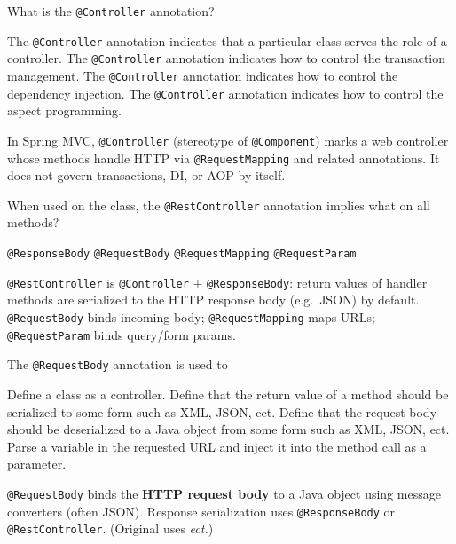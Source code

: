 \question[4]
What is the \texttt{@Controller} annotation?
\begin{choices}
  \CorrectChoice The \texttt{@Controller} annotation indicates that a particular class serves the role of a controller.
  \choice The \texttt{@Controller} annotation indicates how to control the transaction management.
  \choice The \texttt{@Controller} annotation indicates how to control the dependency injection.
  \choice The \texttt{@Controller} annotation indicates how to control the aspect programming.
\end{choices}
\begin{solution}
  In Spring MVC, \texttt{@Controller} (stereotype of \texttt{@Component}) marks a web controller whose methods handle HTTP via \texttt{@RequestMapping} and related annotations. It does not govern transactions, DI, or AOP by itself.
\end{solution}

\question[4]
When used on the class, the \texttt{@RestController} annotation implies what on all methods?
\begin{choices}
  \CorrectChoice \texttt{@ResponseBody}
  \choice \texttt{@RequestBody}
  \choice \texttt{@RequestMapping}
  \choice \texttt{@RequestParam}
\end{choices}
\begin{solution}
  \texttt{@RestController} is \texttt{@Controller} + \texttt{@ResponseBody}: return values of handler methods are serialized to the HTTP response body (e.g.\ JSON) by default. \texttt{@RequestBody} binds incoming body; \texttt{@RequestMapping} maps URLs; \texttt{@RequestParam} binds query/form params.
\end{solution}

\question[4]
The \texttt{@RequestBody} annotation is used to
\begin{choices}
  \choice Define a class as a controller.
  \choice Define that the return value of a method should be serialized to some form such as XML, JSON, ect.
  \CorrectChoice Define that the request body should be deserialized to a Java object from some form such as XML, JSON, ect.
  \choice Parse a variable in the requested URL and inject it into the method call as a parameter.
\end{choices}
\begin{solution}
  \texttt{@RequestBody} binds the \textbf{HTTP request body} to a Java object using message converters (often JSON). Response serialization uses \texttt{@ResponseBody} or \texttt{@RestController}. (Original uses \textit{ect.})
\end{solution}

